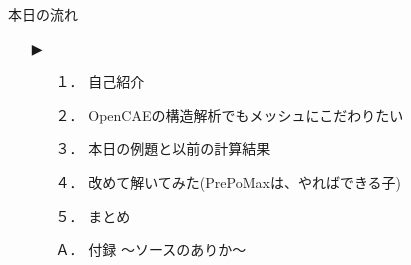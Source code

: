 \begin{frame}{本日の流れ}
  \begin{itemize}
     \item[▶] 
     \begin{itemize}[itemsep=1.3ex, leftmargin=1cm]
       \item[１．] 自己紹介
       \item[２．] OpenCAEの構造解析でもメッシュにこだわりたい
       \item[３．] 本日の例題と以前の計算結果
       \item[４．] 改めて解いてみた(PrePoMaxは、やればできる子)
       \item[５．] まとめ
       \item[Ａ．] 付録 ～ソースのありか～
    \end{itemize}
  \end{itemize}
\end{frame}
